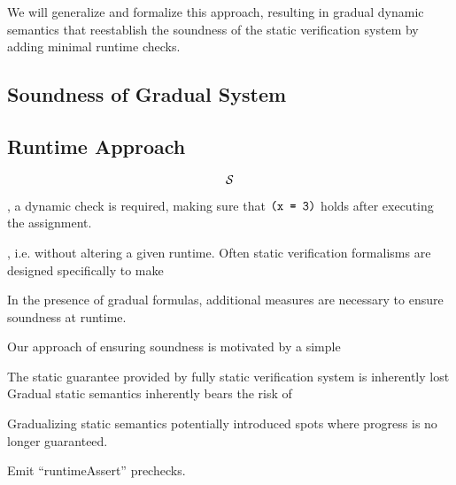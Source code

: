 We will generalize and formalize this approach, resulting in gradual dynamic semantics that reestablish the soundness of the static verification system by adding minimal runtime checks.


\subsection{Soundness of Gradual System}


\subsection{Runtime Approach}
\begin{displaymath}
\mathcal{S}
\end{displaymath}

, a dynamic check is required, making sure that $\texttt{(x = 3)}$ holds after executing the assignment.


 , i.e. without altering a given runtime.
Often static verification formalisms are designed specifically to make 

In the presence of gradual formulas, additional measures are necessary to ensure soundness at runtime.

Our approach of ensuring soundness is motivated by a simple 



The static guarantee provided by fully static verification system is inherently lost 
Gradual static semantics inherently bears the risk of 




Gradualizing static semantics potentially introduced spots where progress is no longer guaranteed.

Emit “runtimeAssert” prechecks.

